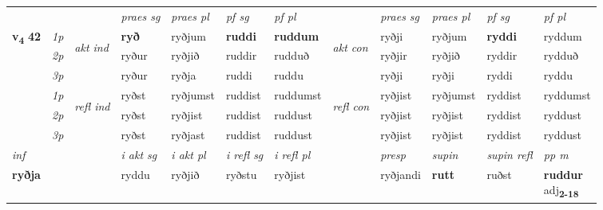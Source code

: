 \begin{longtable}[l]{X>{\footnotesize\itshape}llXXXXlXXXX}
\midrule
 & &   & \textit{praes sg}  & \textit{praes pl}    & \textit{ pf sg} & \textit{pf pl} & & \textit{praes sg}  & \textit{praes pl}    & \textit{pf sg} & \textit{pf pl }  \\ \cmidrule{4-7} \cmidrule{9-12}
 \multirow{2}{*}{{{\textbf{v{\textsubscript{4}}} \Large{\textbf{42}}}}}  & 1p & \multirow{3}{*}{\begin{turn}{90}\textit{akt ind}\end{turn}} & \textbf{ryð} & ryðjum & \textbf{ruddi} & \textbf{ruddum} & \multirow{3}{*}{\begin{turn}{90}\textit{akt con}\end{turn}} &ryðji & ryðjum & \textbf{ryddi} & ryddum\\*
 & 2p &  &  ryður  & ryðjið & ruddir & rudduð & & ryðjir & ryðjið & ryddir & rydduð \\*
 & 3p &  & ryður & ryðja & ruddi & ruddu & & ryðji & ryðji& ryddi & ryddu \\*
\cmidrule{4-7} \cmidrule{9-12}
 & 1p & \multirow{3}{*}{\begin{turn}{90}\textit{refl ind}\end{turn}}  & ryðst & ryðjumst & ruddist & ruddumst & \multirow{3}{*}{\begin{turn}{90}\textit{refl con}\end{turn}}  &ryðjist & ryðjumst & ryddist & ryddumst \\*
 & 2p &  & ryðst & ryðjist & ruddist & ruddust & &ryðjist & ryðjist & ryddist & ryddust \\*
 & 3p  & & ryðst & ryðjast & ruddist & ruddust & & ryðjist & ryðjist& ryddist & ryddust \\*
\cmidrule{4-7} \cmidrule{9-12}

   {\textit{inf}} & &  & \textit{i akt sg} & \textit{i akt pl} & \textit{i refl sg} & \textit{i refl pl} && \textit{presp} & \textit{supin} & \textit{supin refl} & \textit{pp m} \\*
  {\textbf{ryðja}} & && ryddu  & ryðjið & ryðstu & ryðjist && ryðjandi &  \textbf{rutt} & ruðst & \specialcell{\textbf{ruddur} \\ adj\textbf{\textsubscript{2-18}}} \\*

\midrule


\end{longtable}
